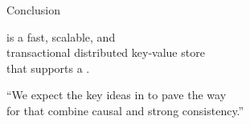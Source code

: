 
\begin{frame}{Conclusion}
  \begin{center}
    \unistore{} is a fast, scalable, and  \\[8pt]
    transactional distributed key-value store \\[8pt]
    that supports a .

    \pause
    \vspace{0.80cm}
    ``We expect the key ideas in \unistore{} to pave the way \\[3pt]
    for  that combine causal and strong consistency.''
  \end{center}
\end{frame}

